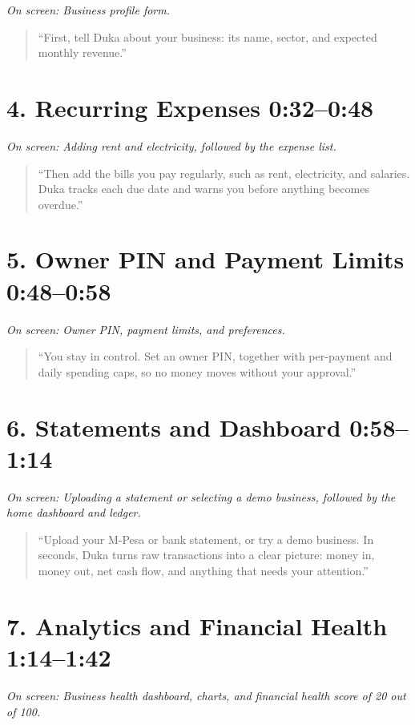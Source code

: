 \documentclass[11pt,a4paper]{article}
\newcommand{\timestamp}[1]{%
  \textcolor{dukablue}{\textbf{#1}}%
}
\newcommand{\screen}[1]{%
  \par\textit{\textcolor{mutedgray}{On screen: #1}}\par
}
\newcommand{\narration}[1]{%
  \begin{quote}
    \smallskip
    ``#1''
    \smallskip
  \end{quote}
}
\begin{document}
\screen{Business profile form.}

\narration{First, tell Duka about your business: its name,
sector, and expected monthly revenue.}

\section*{4. Recurring Expenses \hfill
\small \timestamp{0:32--0:48}}

\screen{Adding rent and electricity, followed by the expense list.}

\narration{Then add the bills you pay regularly, such as rent,
electricity, and salaries. Duka tracks each due date and
warns you before anything becomes overdue.}

\section*{5. Owner PIN and Payment Limits \hfill
\small \timestamp{0:48--0:58}}

\screen{Owner PIN, payment limits, and preferences.}

\narration{You stay in control. Set an owner PIN, together
with per-payment and daily spending caps, so no money moves
without your approval.}

\section*{6. Statements and Dashboard \hfill
\small \timestamp{0:58--1:14}}

\screen{Uploading a statement or selecting a demo business,
followed by the home dashboard and ledger.}

\narration{Upload your M-Pesa or bank statement, or try a
demo business. In seconds, Duka turns raw transactions into
a clear picture: money in, money out, net cash flow, and
anything that needs your attention.}

\section*{7. Analytics and Financial Health \hfill
\small \timestamp{1:14--1:42}}

\screen{Business health dashboard, charts, and financial
health score of 20 out of 100.}
\end{document}
